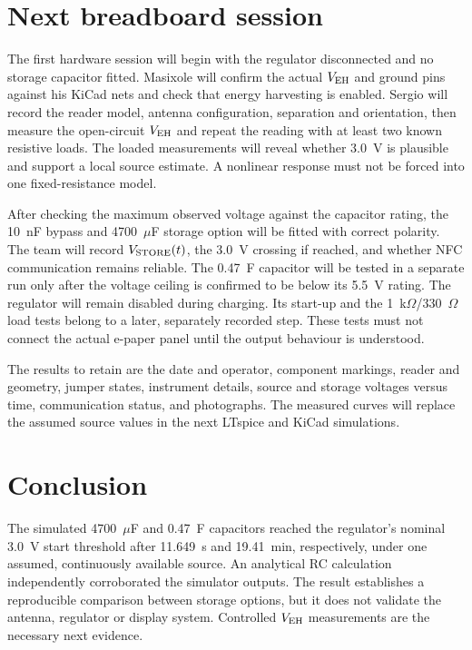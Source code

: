 \documentclass[11pt,a4paper]{article}
\begin{document}
\section{Next breadboard session}
The first hardware session will begin with the regulator disconnected and no storage capacitor fitted. Masixole will confirm the actual $V_{\rm EH}$ and ground pins against his KiCad nets and check that energy harvesting is enabled. Sergio will record the reader model, antenna configuration, separation and orientation, then measure the open-circuit $V_{\rm EH}$ and repeat the reading with at least two known resistive loads. The loaded measurements will reveal whether 3.0~V is plausible and support a local source estimate. A nonlinear response must not be forced into one fixed-resistance model.

After checking the maximum observed voltage against the capacitor rating, the 10~nF bypass and 4700~$\mu$F storage option will be fitted with correct polarity. The team will record $V_{\rm STORE}(t)$, the 3.0~V crossing if reached, and whether NFC communication remains reliable. The 0.47~F capacitor will be tested in a separate run only after the voltage ceiling is confirmed to be below its 5.5~V rating. The regulator will remain disabled during charging. Its start-up and the 1~k$\Omega$/330~$\Omega$ load tests belong to a later, separately recorded step. These tests must not connect the actual e-paper panel until the output behaviour is understood.

The results to retain are the date and operator, component markings, reader and geometry, jumper states, instrument details, source and storage voltages versus time, communication status, and photographs. The measured curves will replace the assumed source values in the next LTspice and KiCad simulations.

\section{Conclusion}
The simulated 4700~$\mu$F and 0.47~F capacitors reached the regulator's nominal 3.0~V start threshold after 11.649~s and 19.41~min, respectively, under one assumed, continuously available source. An analytical RC calculation independently corroborated the simulator outputs. The result establishes a reproducible comparison between storage options, but it does not validate the antenna, regulator or display system. Controlled $V_{\rm EH}$ measurements are the necessary next evidence.



\end{document}
